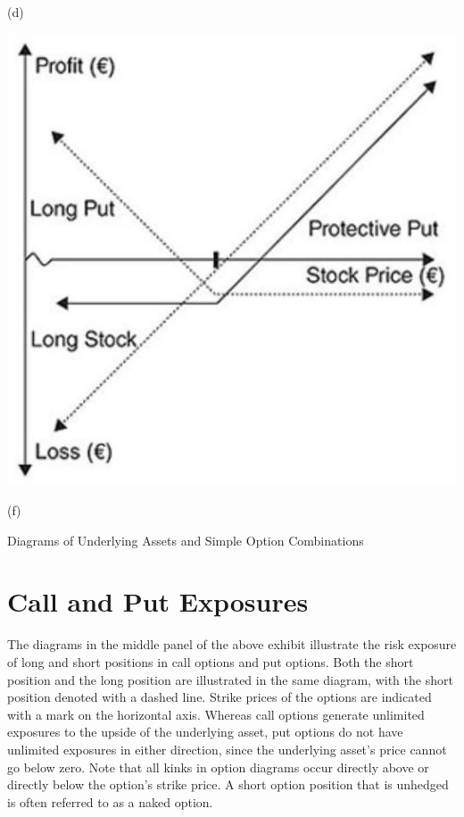 \documentclass[11pt]{article}
\begin{document}
(d)

\begin{center}
\includegraphics[max width=\textwidth]{2024_04_11_d71a2c9aea882dc3a7b2g-3(5)}
\end{center}

(f)

Diagrams of Underlying Assets and Simple Option Combinations

\section*{Call and Put Exposures}
The diagrams in the middle panel of the above exhibit illustrate the risk exposure of long and short positions in call options and put options. Both the short position and the long position are illustrated in the same diagram, with the short position denoted with a dashed line. Strike prices of the options are indicated with a mark on the horizontal axis. Whereas call options generate unlimited exposures to the upside of the underlying asset, put options do not have unlimited exposures in either direction, since the underlying asset's price cannot go below zero. Note that all kinks in option diagrams occur directly above or directly below the option's strike price. A short option position that is unhedged is often referred to as a naked option.
\end{document}
